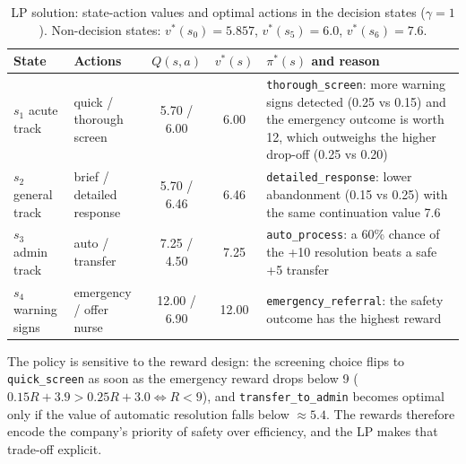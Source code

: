 \documentclass[10pt,a4paper]{article}
\newcommand{\code}[1]{\texttt{#1}}
\begin{document}
\begin{table}[t]
\centering\footnotesize
\caption{LP solution: state-action values and optimal actions in the decision states ($\gamma=1$). Non-decision states: $v^\ast(s_0)=5.857$, $v^\ast(s_5)=6.0$, $v^\ast(s_6)=7.6$.}
\label{tab:lp}
\setlength{\tabcolsep}{4pt}
\begin{tabular}{>{\raggedright\arraybackslash}p{2.3cm}>{\raggedright\arraybackslash}p{2.9cm}cc>{\raggedright\arraybackslash}p{8.0cm}}
\toprule
State & Actions & $Q(s,a)$ & $v^\ast(s)$ & $\pi^\ast(s)$ and reason\\
\midrule
$s_1$ acute track & quick / thorough screen & 5.70 / 6.00 & 6.00 & \code{thorough\_screen}: more warning signs detected (0.25 vs 0.15) and the emergency outcome is worth 12, which outweighs the higher drop-off (0.25 vs 0.20)\\
$s_2$ general track & brief / detailed response & 5.70 / 6.46 & 6.46 & \code{detailed\_response}: lower abandonment (0.15 vs 0.25) with the same continuation value 7.6\\
$s_3$ admin track & auto / transfer & 7.25 / 4.50 & 7.25 & \code{auto\_process}: a 60\% chance of the +10 resolution beats a safe +5 transfer\\
$s_4$ warning signs & emergency / offer nurse & 12.00 / 6.90 & 12.00 & \code{emergency\_referral}: the safety outcome has the highest reward\\
\bottomrule
\end{tabular}
\end{table}

The policy is sensitive to the reward design: the screening choice flips to \code{quick\_screen} as soon as the emergency reward drops below 9 ($0.15R+3.9 > 0.25R+3.0 \Leftrightarrow R<9$), and \code{transfer\_to\_admin} becomes optimal only if the value of automatic resolution falls below $\approx 5.4$. The rewards therefore encode the company's priority of safety over efficiency, and the LP makes that trade-off explicit.
\end{document}
